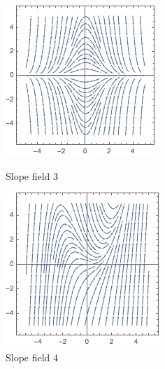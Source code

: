 \documentclass[11pt]{exam}
\begin{document}
\begin{questions}
\begin{figure}[h]
\centering
\begin{minipage}{.5\textwidth}
  \centering
  \includegraphics[width=.4\linewidth]{slopefield3}
  \caption{Slope field 3}
\end{minipage}%
\begin{minipage}{.5\textwidth}
  \centering
  \includegraphics[width=.4\linewidth]{slopefield4}
  \caption{Slope field 4}
\end{minipage}
\end{figure}

\end{questions}
\end{document}
